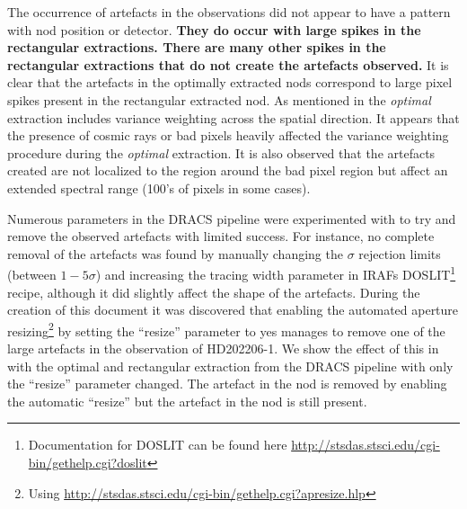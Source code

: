 The occurrence of artefacts in the observations did not appear to have a pattern with nod position or detector. \textbf{They do occur with large spikes in the rectangular extractions.
There are many other spikes in the rectangular extractions that do not create the artefacts observed.
}
It is clear that the artefacts in the optimally extracted nods correspond to large pixel spikes present in the rectangular extracted nod.
As mentioned in  the \emph{optimal} extraction includes variance weighting across the spatial direction.
It appears that the presence of cosmic rays or bad pixels heavily affected the variance weighting procedure during the \emph{optimal} extraction.
It is also observed that the artefacts created are not localized to the region around the bad pixel region but affect an extended spectral range (100's of pixels in some cases).

Numerous parameters in the {DRACS} pipeline were experimented with to try and remove the observed artefacts with limited success.
For instance, no complete removal of the artefacts was found by manually changing the \(\sigma\) rejection limits (between \(1-5 \sigma\)) and increasing the tracing width parameter in {IRAF}s DOSLIT\footnote{Documentation for DOSLIT can be found here \href{http://stsdas.stsci.edu/cgi-bin/gethelp.cgi?doslit}{http://stsdas.stsci.edu/cgi-bin/gethelp.cgi?doslit}} recipe, although it did slightly affect the shape of the artefacts.
During the creation of this document it was discovered that enabling the automated aperture resizing\footnote{Using \href{apresize}{http://stsdas.stsci.edu/cgi-bin/gethelp.cgi?apresize.hlp}} by setting the ``resize'' parameter to yes manages to remove one of the large artefacts in the observation of {HD202206-1}.
We show the effect of this in  with the optimal and rectangular extraction from the {DRACS} pipeline with only the ``resize'' parameter changed.
The artefact in the  nod is removed by enabling the automatic ``resize'' but the artefact in the  nod is still present.

